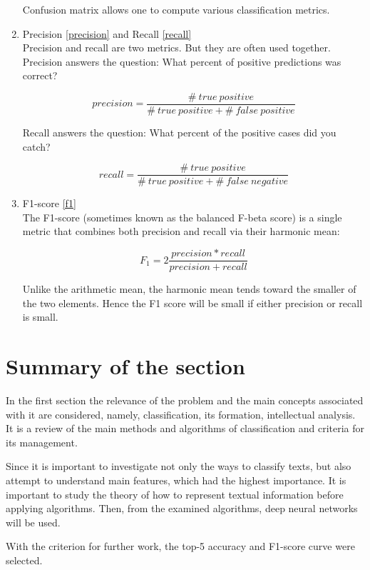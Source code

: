 \begin{enumerate}
\begin{figure}[ht]
	\end{figure}
	
	Confusion matrix allows one to compute various classification metrics.
	
	\item Precision \ref{precision} and Recall \ref{recall}\\
	Precision and recall are two metrics. But they are often used together.
	Precision answers the question: What percent of positive predictions was correct?
	
	\begin{equation}
	\label{precision}
	precision = {\frac{\#\ true\ positive}{\#\ true\ positive + \#\ false\ positive}}
	\end{equation}
\begin{doublespacing}
\end{doublespacing}
	
	Recall answers the question: What percent of the positive cases did you catch?
	
	\begin{equation}
	\label{recall}
	recall = {\frac{\#\ true\ positive}{\#\ true\ positive + \#\ false\ negative}}
	\end{equation}
\begin{doublespacing}
\end{doublespacing}
	
	\item F1-score \ref{f1}\\
	The F1-score (sometimes known as the balanced F-beta score) is a single metric that combines both precision and recall via their harmonic mean:
	
	\begin{equation}
	\label{f1}
	F_1 = 2 {\frac{precision * recall}{precision + recall}}
	\end{equation}
\begin{doublespacing}
\end{doublespacing}
	
	Unlike the arithmetic mean, the harmonic mean tends toward the smaller of the two elements. Hence the F1 score will be small if either precision or recall is small.
\end{enumerate}

\section{Summary of the section}

In the first section the relevance of the problem and the main concepts associated with it are considered, namely, classification, its formation, intellectual analysis. It is a review of the main methods and algorithms of classification and criteria for its management.

Since it is important to investigate not only the ways to classify texts, but also attempt to understand main features, which had the highest importance. It is important to study the theory of how to represent textual information before applying algorithms. Then, from the examined algorithms, deep neural networks will be used. 

With the criterion for further work, the top-5 accuracy and F1-score curve were selected.
